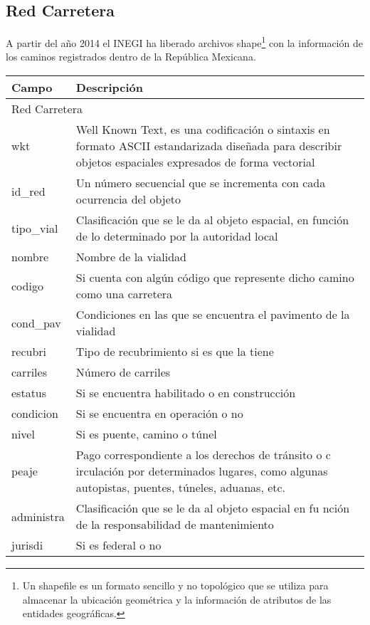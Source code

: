 \pagebreak
\subsection{Red Carretera}
A partir del año 2014 el INEGI ha liberado archivos shape\footnote{Un shapefile es un formato sencillo y no topológico que se utiliza para almacenar la ubicación geométrica y la información de atributos de las entidades geográficas.} con la información de los caminos registrados dentro de la República Mexicana.

\begin{longtable}{|p{8cm}|p{8cm}|}
    \hline
    \hline
    Campo  & Descripción\\
    \hline
    \multicolumn{2}{l}{Red Carretera}\\
    wkt &  Well Known Text, es una codificación o sintaxis en formato ASCII estandarizada diseñada para describir objetos espaciales expresados de forma vectorial\\
    \hline
    id\_red & Un número secuencial que se incrementa con cada ocurrencia del objeto\\
    \hline
    tipo\_vial & Clasificación que se le da al objeto espacial, en función de lo determinado por la autoridad local\\
    \hline
    nombre & Nombre de la vialidad\\
    \hline
    codigo & Si cuenta con algún código que represente dicho camino como una carretera\\
    \hline
    cond\_pav & Condiciones en las que se encuentra el pavimento de la vialidad\\
    \hline
    recubri & Tipo de recubrimiento si es que la tiene\\
    \hline
    carriles & Número de carriles\\
    \hline
    estatus & Si se encuentra habilitado o en construcción\\
    \hline
    condicion & Si se encuentra en operación o no\\
    \hline
    nivel & Si es puente, camino o túnel\\
    \hline
    peaje & Pago  correspondiente  a  los  derechos  de  tránsito  o  c
irculación  por  determinados  lugares,  como algunas autopistas, puentes, túneles, aduanas, etc.\\
    \hline
    administra & Clasificación  que  se  le  da  al  objeto  espacial  en  fu
nción  de  la  responsabilidad  de mantenimiento\\
    \hline
    jurisdi & Si es federal o no\\

\end{longtable}

